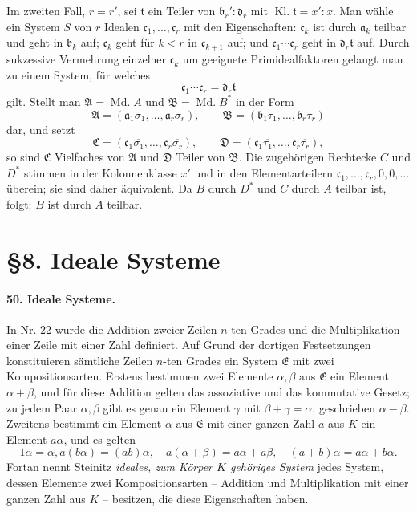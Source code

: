 \documentclass[11pt]{article}
\newcommand{\Md}{\operatorname{Md.}}
\newcommand{\Kl}{\operatorname{Kl.}}
\begin{document}
Im zweiten Fall, $r=r'$, sei $\mathfrak t$ ein Teiler von $\mathfrak b_r':\mathfrak d_r$ mit $\Kl\mathfrak t=x':x$. Man wähle ein System $S$ von $r$ Idealen $\mathfrak c_1,
\ldots,
\mathfrak c_r$ mit den Eigenschaften: $\mathfrak c_k$ ist durch $\mathfrak a_k$ teilbar und geht in $\mathfrak b_k$ auf; $\mathfrak c_k$ geht für $k<r$ in $\mathfrak c_{k+1}$ auf; und $\mathfrak c_1\cdots\mathfrak c_r$ geht in $\mathfrak d_r\mathfrak t$ auf. Durch sukzessive Vermehrung einzelner $\mathfrak c_k$ um geeignete Primidealfaktoren gelangt man zu einem System, für welches
\[
\mathfrak c_1\cdots\mathfrak c_r=\mathfrak d_r\mathfrak t
\]
gilt. Stellt man $\mathfrak A=\Md A$ und $\mathfrak B=\Md B^*$ in der Form
\[
\mathfrak A=(\mathfrak a_1\overline{\sigma_1},
\ldots,
\mathfrak a_r\overline{\sigma_r}),
\qquad
\mathfrak B=(\mathfrak b_1\overline{\tau_1},
\ldots,
\mathfrak b_r\overline{\tau_r})
\]
dar, und setzt
\[
\mathfrak C=(\mathfrak c_1\overline{\sigma_1},
\ldots,
\mathfrak c_r\overline{\sigma_r}),
\qquad
\mathfrak D=(\mathfrak c_1\overline{\tau_1},
\ldots,
\mathfrak c_r\overline{\tau_r}),
\]
so sind $\mathfrak C$ Vielfaches von $\mathfrak A$ und $\mathfrak D$ Teiler von $\mathfrak B$. Die zugehörigen Rechtecke $C$ und $D^*$ stimmen in der Kolonnenklasse $x'$ und in den Elementarteilern $\mathfrak c_1,
\ldots,
\mathfrak c_r,0,0,
\ldots$ überein; sie sind daher äquivalent. Da $B$ durch $D^*$ und $C$ durch $A$ teilbar ist, folgt: $B$ ist durch $A$ teilbar.

\section*{\S 8. Ideale Systeme}

\paragraph{50. Ideale Systeme.}
In Nr. 22 wurde die Addition zweier Zeilen $n$-ten Grades und die Multiplikation einer Zeile mit einer Zahl definiert. Auf Grund der dortigen Festsetzungen konstituieren sämtliche Zeilen $n$-ten Grades ein System $\mathfrak E$ mit zwei Kompositionsarten. Erstens bestimmen zwei Elemente $\alpha,
\beta$ aus $\mathfrak E$ ein Element $\alpha+
\beta$, und für diese Addition gelten das assoziative und das kommutative Gesetz; zu jedem Paar $\alpha,
\beta$ gibt es genau ein Element $\gamma$ mit $\beta+
\gamma=\alpha$, geschrieben $\alpha-
\beta$. Zweitens bestimmt ein Element $\alpha$ aus $\mathfrak E$ mit einer ganzen Zahl $a$ aus $K$ ein Element $a\alpha$, und es gelten
\[
1\alpha=\alpha,
a(b\alpha)=(ab)\alpha,
\quad
 a(\alpha+
\beta)=a\alpha+a\beta,
\quad
(a+b)\alpha=a\alpha+b\alpha.
\]
Fortan nennt Steinitz \emph{ideales, zum Körper $K$ gehöriges System} jedes System, dessen Elemente zwei Kompositionsarten -- Addition und Multiplikation mit einer ganzen Zahl aus $K$ -- besitzen, die diese Eigenschaften haben.
\end{document}
